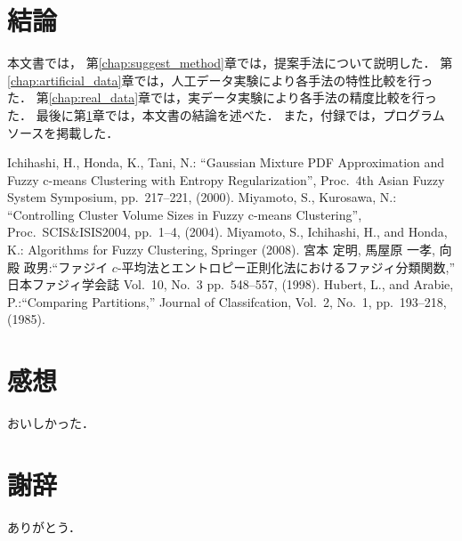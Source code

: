 \documentclass[a4j,12pt,dvipdfmx,oneside]{jsbook}
\theoremstyle{definition}
\begin{document}
\chapter{結論}\label{chap:conclusion}
本文書では，
第\ref{chap:suggest_method}章では，提案手法について説明した．
第\ref{chap:artificial_data}章では，人工データ実験により各手法の特性比較を行った．
第\ref{chap:real_data}章では，実データ実験により各手法の精度比較を行った．
最後に第\ref{chap:conclusion}章では，本文書の結論を述べた．
また，付録では，プログラムソースを掲載した．
%
%
%
%
%
%
\begin{thebibliography}{5}
Ichihashi, H., Honda, K., Tani, N.: ``Gaussian Mixture PDF Approximation and Fuzzy c-means Clustering with Entropy Regularization'', Proc.~4th Asian Fuzzy System Symposium, pp.~217--221, (2000).
Miyamoto, S., Kurosawa, N.: ``Controlling Cluster Volume Sizes in Fuzzy c-means Clustering'', Proc.~SCIS\&ISIS2004, pp.~1--4, (2004).
Miyamoto, S., Ichihashi, H., and Honda, K.: Algorithms for Fuzzy Clustering, Springer (2008).
宮本 定明, 馬屋原 一孝, 向殿 政男:``ファジイ $c$-平均法とエントロピー正則化法におけるファジィ分類関数,''  日本ファジィ学会誌 Vol.~10, No.~3  pp.~548--557, (1998).
 Hubert, L., and Arabie, P.:``Comparing Partitions,'' Journal of Classifcation, Vol.~2, No.~1,
pp.~193--218, (1985).
\end{thebibliography}
%
\chapter*{感想}
\label{chap:feel}
おいしかった．
\chapter*{謝辞}
\label{chap:ack}
ありがとう．
\appendix
\pagestyle{headings}
\end{document}
